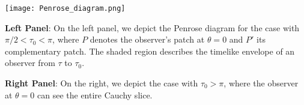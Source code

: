 \documentclass[12pt]{article}
\begin{document}
\begin{center}
\texttt{[image: Penrose\_diagram.png]}
\end{center}

\textbf{Left Panel}: On the left panel, we depict the Penrose diagram for the case with $\pi/2 < \tau_0 < \pi$, where $P$ denotes the observer's patch at $\theta=0$ and $P'$ its complementary patch. The shaded region describes the timelike envelope of an observer from $\tau$ to $\tau_0$.

\textbf{Right Panel}: On the right, we depict the case with $\tau_0 > \pi$, where the observer at $\theta=0$ can see the entire Cauchy slice.
\end{document}
